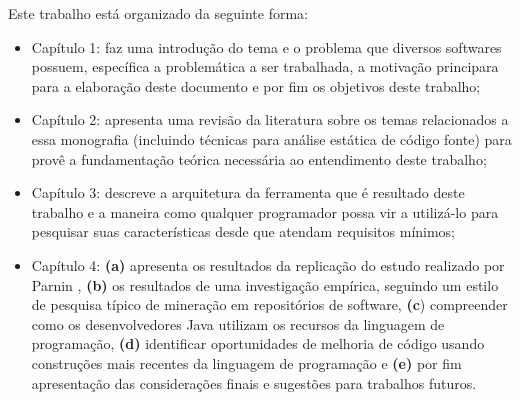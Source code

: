  Este trabalho está organizado da seguinte forma:
	\begin{itemize}
		\item Capítulo 1: faz uma introdução do tema e o problema que diversos softwares possuem, específica a problemática a ser trabalhada, a motivação principara para a elaboração deste documento e por fim os objetivos deste trabalho;
		
		\item Capítulo 2: apresenta uma revisão da literatura sobre os temas relacionados a essa monografia (incluindo técnicas para análise estática de código fonte) para provê a fundamentação teórica necessária ao entendimento deste trabalho;
		
		\item Capítulo 3: descreve a arquitetura da ferramenta que é resultado deste trabalho e a maneira como qualquer programador possa vir a utilizá-lo para pesquisar suas características desde que atendam requisitos mínimos;
		
		\item Capítulo 4: \textbf{(a)} apresenta os resultados da replicação do estudo realizado por Parnin \cite{Parnin:ACM2011}, \textbf{(b)} os resultados de uma investigação empírica, seguindo um estilo de pesquisa típico de mineração em 
		repositórios de software, \textbf{(c}) compreender como os desenvolvedores 
		Java utilizam os recursos da linguagem de programação, \textbf{(d)} identificar 
		oportunidades de melhoria de código usando construções mais 
		recentes da linguagem de programação e \textbf{(e)} por fim apresentação das considerações finais e sugestões para trabalhos futuros. 
	\end{itemize}



	
%	

